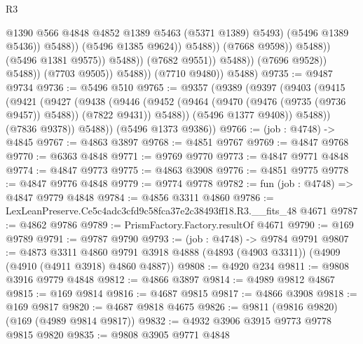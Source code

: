 \begin{lexlean}{R3}
\begin{coremodule}
                                                    @1390
                                                    @566
                                                    @4848
                                                    @4852
                                                    @1389
                                                    @5463
                                                    (@5371 @1389)
                                                    @5493)
                                                  (@5496 @1389 @5436))
                                                @5488))
                                            (@5496 @1385 @9624))
                                          @5488))
                                      (@7668 @9598))
                                    @5488))
                                (@5496 @1381 @9575))
                              @5488))
                          (@7682 @9551))
                        @5488))
                    (@7696 @9528))
                  @5488))
              (@7703 @9505))
            @5488))
        (@7710 @9480))
      @5488)
@9735 := @9487 @9734
@9736 := @5496 @510
@9765 := @9357
    (@9389
      (@9397
        (@9403
          (@9415
            (@9421
              (@9427
                (@9438
                  (@9446
                    (@9452 (@9464 (@9470 (@9476 (@9735 (@9736 @9457)) @5488)) (@7822 @9431)) @5488))
                  (@5496 @1377 @9408))
                @5488))
            (@7836 @9378))
          @5488))
      (@5496 @1373 @9386))
@9766 := (job : @4748) -> @4845
@9767 := @4863 @3897
@9768 := @4851 @9767
@9769 := @4847 @9768
@9770 := @6363 @4848
@9771 := @9769 @9770
@9773 := @4847 @9771 @4848
@9774 := @4847 @9773
@9775 := @4863 @3908
@9776 := @4851 @9775
@9778 := @4847 @9776 @4848
@9779 := @9774 @9778
@9782 := fun (job : @4748) => @4847 @9779 @4848
@9784 := @4856 @3311 @4860
@9786 := LexLeanPreserve.Ce5c4adc3cfd9c58fca37e2c38493ff18.R3.__fits_48 @4671
@9787 := @4862 @9786
@9789 := PrismFactory.Factory.resultOf @4671
@9790 := @169 @9789
@9791 := @9787 @9790
@9793 := (job : @4748) -> @9784 @9791
@9807 := @4873
    @3311
    @4860
    @9791
    @3918
    @4888
    (@4893 (@4903 @3311))
    (@4909 (@4910 (@4911 @3918) @4860 @4887))
@9808 := @4920 @234
@9811 := @9808 @3916 @9779 @4848
@9812 := @4866 @3897
@9814 := @4989 @9812 @4867
@9815 := @169 @9814
@9816 := @4687 @9815
@9817 := @4866 @3908
@9818 := @169 @9817
@9820 := @4687 @9818 @4675
@9826 := @9811 (@9816 @9820) (@169 (@4989 @9814 @9817))
@9832 := @4932 @3906 @3915 @9773 @9778 @9815 @9820
@9835 := @9808 @3905 @9771 @4848

\end{coremodule}
\end{lexlean}
